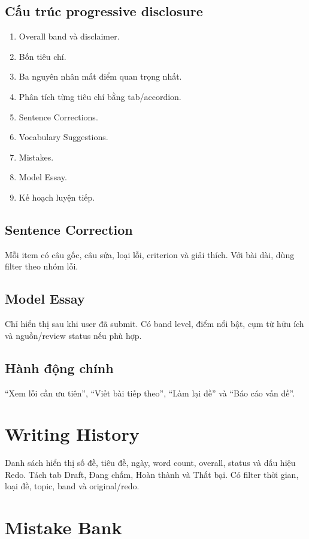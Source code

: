 \documentclass[11pt,a4paper]{article}
\begin{document}
\subsection{Cấu trúc progressive disclosure}
\begin{enumerate}
  \item Overall band và disclaimer.
  \item Bốn tiêu chí.
  \item Ba nguyên nhân mất điểm quan trọng nhất.
  \item Phân tích từng tiêu chí bằng tab/accordion.
  \item Sentence Corrections.
  \item Vocabulary Suggestions.
  \item Mistakes.
  \item Model Essay.
  \item Kế hoạch luyện tiếp.
\end{enumerate}

\subsection{Sentence Correction}
Mỗi item có câu gốc, câu sửa, loại lỗi, criterion và giải thích. Với bài dài, dùng filter theo nhóm lỗi.

\subsection{Model Essay}
Chỉ hiển thị sau khi user đã submit. Có band level, điểm nổi bật, cụm từ hữu ích và nguồn/review status nếu phù hợp.

\subsection{Hành động chính}
``Xem lỗi cần ưu tiên'', ``Viết bài tiếp theo'', ``Làm lại đề'' và ``Báo cáo vấn đề''.

\section{Writing History}
Danh sách hiển thị số đề, tiêu đề, ngày, word count, overall, status và dấu hiệu Redo. Tách tab Draft, Đang chấm, Hoàn thành và Thất bại. Có filter thời gian, loại đề, topic, band và original/redo.

\section{Mistake Bank}
\end{document}
